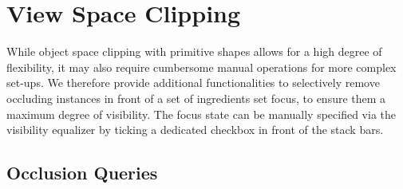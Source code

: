 \vspace{-2mm}
\section{View Space Clipping}

While object space clipping with primitive shapes allows for a high degree of flexibility, it may also require cumbersome manual operations for more complex set-ups.
We therefore provide additional functionalities to selectively remove occluding instances in front of a set of ingredients set focus, to ensure them a maximum degree of visibility.
The focus state can be manually specified via the visibility equalizer by ticking a dedicated checkbox in front of the stack bars.

\vspace{-2mm}
\subsection{Occlusion Queries}
\label{sec:OQ}

